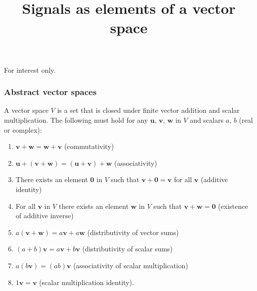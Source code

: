 \documentclass[10pt]{beamer}
\title{Signals as elements of a vector space}
\author{}
\date{}
\begin{document}
\begin{frame}
  \titlepage
\end{frame}


For interest only.

\begin{frame}
  \frametitle{Abstract vector spaces}
  A vector space $V$ is a set that is closed under finite vector addition and scalar multiplication.  The following must hold for any $\mathbf{u}$, $\mathbf{v}$, $\mathbf{w}$ in $V$ and scalars $a$, $b$ (real or complex):
  \begin{enumerate}
  \item $\mathbf{v} + \mathbf{w} = \mathbf{w} + \mathbf{v}$ (commutativity)
  \item $\mathbf{u} + (\mathbf{v} + \mathbf{w}) = (\mathbf{u} + \mathbf{v}) + \mathbf{w}$ (associativity)
  \item There exists an element $\mathbf{0}$ in $V$ such that $\mathbf{v} + \mathbf{0} = \mathbf{v}$ for all $\mathbf{v}$ (additive identity)
  \item For all $\mathbf{v}$ in $V$ there exists an element $\mathbf{w}$ in $V$ such that $\mathbf{v} + \mathbf{w} = \mathbf{0}$ (existence of additive inverse)
  \item $a(\mathbf{v} + \mathbf{w}) = a \mathbf{v} + a \mathbf{w}$ (distributivity of vector sums)
  \item $(a + b) \mathbf{v} = a \mathbf{v} + b \mathbf{v}$ (distributivity of scalar sums)
  \item $a(b \mathbf{v}) = (a b) \mathbf{v}$ (associativity of scalar multiplication)
  \item $1 \mathbf{v} = \mathbf{v}$ (scalar multiplication identity).
  \end{enumerate}
\end{frame}
\end{document}
